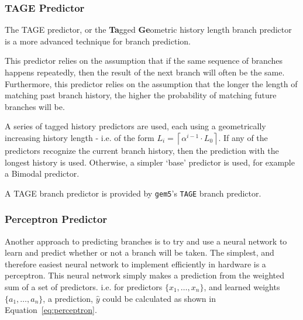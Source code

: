 \subsubsection{TAGE Predictor}
%

The TAGE predictor, or the \textbf{Ta}gged \textbf{Ge}ometric history
length branch predictor is a more advanced technique for branch
prediction.

This predictor relies on the assumption that if the same sequence of
branches happens repeatedly, then the result of the next branch will often
be the same.
Furthermore, this predictor relies on the assumption that the longer
the length of matching past branch history, the higher
the probability of matching future branches will be.~\cite{Seznec2006}

A series of tagged history predictors are used, each using a geometrically
increasing history length - i.e. of the form
\(L_i = \left\lceil \alpha^{i-1} \cdot L_0 \right\rceil\).
If any of the predictors recognize the current branch history,
then the prediction with the longest history is used.
Otherwise, a simpler `base' predictor is used, for example a Bimodal
predictor.~\cite{Seznec2007,Michaud2005}

A TAGE branch predictor is provided by \texttt{gem5}'s \texttt{TAGE}
branch predictor. %

\subsubsection{Perceptron Predictor}

%

Another approach to predicting branches is to try and use a
neural network to learn and predict whether or not a branch will
be taken.
The simplest, and therefore easiest neural network to implement
efficiently in hardware is a perceptron.
This neural network simply makes a prediction from the weighted
sum of a set of predictors. i.e. for predictors \(\{ x_1, \ldots , x_n \}\),
and learned weights \(\{ a_1, \ldots , a_n \}\), a prediction, \(\hat{y}\) could
be calculated as shown in Equation~\ref{eq:perceptron}.

